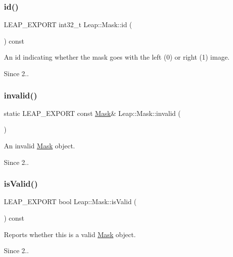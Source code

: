 \subsubsection{\texorpdfstring{id()}{id()}}
{\footnotesize\ttfamily L\+E\+A\+P\+\_\+\+E\+X\+P\+O\+RT int32\+\_\+t Leap\+::\+Mask\+::id (\begin{DoxyParamCaption}{ }\end{DoxyParamCaption}) const}

An id indicating whether the mask goes with the left (0) or right (1) image. 
\begin{DoxyCodeInclude}
\end{DoxyCodeInclude}
 \begin{DoxySince}{Since}
2.. 
\end{DoxySince}
\mbox{\label{class_leap_1_1_mask_ab2eddf087a16d99191aca5cc2a4a508b}} 
\subsubsection{\texorpdfstring{invalid()}{invalid()}}
{\footnotesize\ttfamily static L\+E\+A\+P\+\_\+\+E\+X\+P\+O\+RT const \hyperlink{class_leap_1_1_mask}{Mask}\& Leap\+::\+Mask\+::invalid (\begin{DoxyParamCaption}{ }\end{DoxyParamCaption})\hspace{0.3cm}{\ttfamily [static]}}

An invalid \hyperlink{class_leap_1_1_mask}{Mask} object. \begin{DoxySince}{Since}
2.. 
\end{DoxySince}
\mbox{\label{class_leap_1_1_mask_a8b579ee2f0a32247b4c38cc48b4ed208}} 
\subsubsection{\texorpdfstring{is\+Valid()}{isValid()}}
{\footnotesize\ttfamily L\+E\+A\+P\+\_\+\+E\+X\+P\+O\+RT bool Leap\+::\+Mask\+::is\+Valid (\begin{DoxyParamCaption}{ }\end{DoxyParamCaption}) const}

Reports whether this is a valid \hyperlink{class_leap_1_1_mask}{Mask} object. \begin{DoxySince}{Since}
2.. 
\end{DoxySince}
\mbox{\label{class_leap_1_1_mask_a223fe75539f8afa78665ae55b2270dc2}} 
